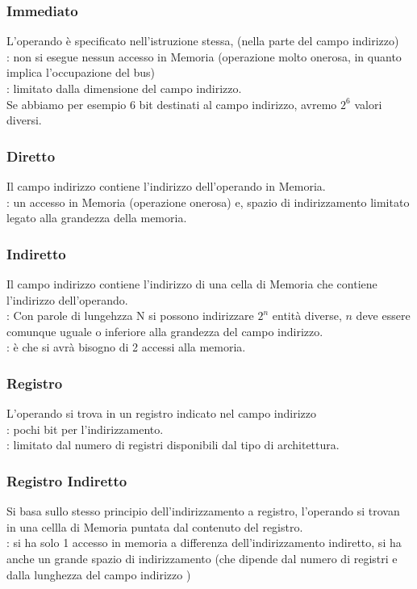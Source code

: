 \documentclass[arch.tex]{subfiles}
\begin{document}
\subsubsection{Immediato}
L'operando è specificato nell'istruzione stessa, (nella parte del campo 
indirizzo)\\
: non si esegue nessun accesso in Memoria
(operazione molto onerosa, in quanto implica l'occupazione del bus)\\
: limitato dalla dimensione del campo indirizzo.\\
Se abbiamo per esempio 6 bit destinati al campo indirizzo, avremo  $ 2^6 $ 
valori diversi.


\subsubsection{Diretto}
Il campo indirizzo contiene l'indirizzo dell'operando in Memoria.\\
: un accesso in Memoria (operazione onerosa) e, spazio di indirizzamento 
limitato legato alla grandezza della memoria.


\subsubsection{Indiretto}
Il campo indirizzo contiene l'indirizzo di una cella di Memoria che contiene 
l'indirizzo dell'operando. \\
: Con parole di lungehzza N si possono indirizzare
$ 2^n $ entità diverse, $ n $ deve essere comunque uguale o inferiore alla
grandezza del campo indirizzo.\\
: è che si avrà bisogno di 2 accessi alla memoria.


\subsubsection{Registro}
L'operando si trova in un registro indicato nel campo indirizzo\\
: pochi bit per l'indirizzamento.\\
: limitato dal numero di registri disponibili dal 
tipo di architettura.


\subsubsection{Registro Indiretto}
Si basa sullo stesso principio dell'indirizzamento a registro, l'operando 
si trovan in una cellla di Memoria puntata dal contenuto del registro.\\
: si ha solo 1 accesso in memoria a differenza dell'indirizzamento indiretto,
si ha anche un grande spazio di indirizzamento (che dipende dal numero di registri e dalla
lunghezza del campo indirizzo )
\end{document}
